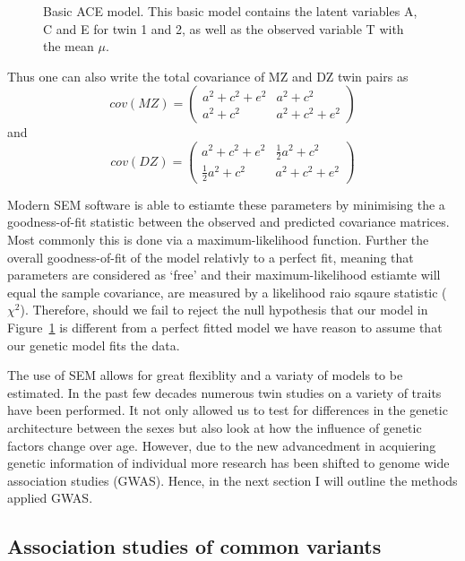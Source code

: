 \begin{figure}[htpb]
  \centering
  \scalebox{0.6}{}
  \caption{
    Basic ACE model.
    This basic model contains the latent variables A, C and E for twin 1 and 2, as well as the observed variable T with the mean $\mu$.
  }\label{fig:ace}
\end{figure}

Thus one can also write the total covariance of MZ and DZ twin pairs as
\begin{equation}
  cov(MZ) = 
  \begin{pmatrix}
    a^2 + c^2 + e^2 & a^2 + c^2 \\
    a^2 + c^2 & a^2 + c^2 + e^2
  \end{pmatrix}
\end{equation}
and 
\begin{equation}
  cov(DZ) = 
  \begin{pmatrix}
    a^2 + c^2 + e^2 & \frac{1}{2}a^2 + c^2 \\
    \frac{1}{2}a^2 + c^2 & a^2 + c^2 + e^2
  \end{pmatrix}
\end{equation}

Modern SEM software is able to estiamte these parameters by minimising the a goodness-of-fit statistic between the observed and predicted covariance matrices.
Most commonly this is done via a maximum-likelihood function.
Further the overall goodness-of-fit of the model relativly to a perfect fit, meaning that parameters are considered as `free' and their maximum-likelihood estiamte will equal the sample covariance, are measured by a likelihood raio sqaure statistic ($\chi^2$).
Therefore, should we fail to reject the null hypothesis that our model in Figure~\ref{fig:ace} is different from a perfect fitted model we have reason to assume that our genetic model fits the data.

The use of SEM allows for great flexiblity and a variaty of models to be estimated.
In the past few decades numerous twin studies on a variety of traits have been performed.
It not only allowed us to test for differences in the genetic architecture between the sexes but also look at how the influence of genetic factors change over age.
However, due to the new advancedment in acquiering genetic information of individual more research has been shifted to genome wide association studies (GWAS).
Hence, in the next section I will outline the methods applied GWAS\@.

\subsection{Association studies of common variants}
\label{sub:association_studies_of_common_variants}


